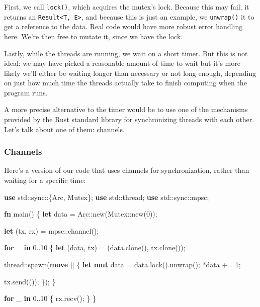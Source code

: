 \documentclass[a4paper,]{book}
\newenvironment{Shaded}{\begin{snugshade}}{\end{snugshade}}
\newcommand{\KeywordTok}[1]{\textcolor[rgb]{0.13,0.29,0.53}{\textbf{{#1}}}}
\newcommand{\DecValTok}[1]{\textcolor[rgb]{0.00,0.00,0.81}{{#1}}}
\newcommand{\NormalTok}[1]{{#1}}
\begin{document}
First, we call \texttt{lock()}, which acquires the mutex's lock. Because
this may fail, it returns an
\texttt{Result\textless{}T,\ E\textgreater{}}, and because this is just
an example, we \texttt{unwrap()} it to get a reference to the data. Real
code would have more robust error handling here. We're then free to
mutate it, since we have the lock.

Lastly, while the threads are running, we wait on a short timer. But
this is not ideal: we may have picked a reasonable amount of time to
wait but it's more likely we'll either be waiting longer than necessary
or not long enough, depending on just how much time the threads actually
take to finish computing when the program runs.

A more precise alternative to the timer would be to use one of the
mechanisms provided by the Rust standard library for synchronizing
threads with each other. Let's talk about one of them: channels.

\subsubsection{Channels}\label{channels}

Here's a version of our code that uses channels for synchronization,
rather than waiting for a specific time:

\begin{Shaded}
\begin{Highlighting}[]
\KeywordTok{use} \NormalTok{std::sync::\{Arc, Mutex\};}
\KeywordTok{use} \NormalTok{std::thread;}
\KeywordTok{use} \NormalTok{std::sync::mpsc;}

\KeywordTok{fn} \NormalTok{main() \{}
    \KeywordTok{let} \NormalTok{data = Arc::new(Mutex::new(}\DecValTok{0}\NormalTok{));}

    \KeywordTok{let} \NormalTok{(tx, rx) = mpsc::channel();}

    \KeywordTok{for} \NormalTok{_ }\KeywordTok{in} \DecValTok{0.}\NormalTok{.}\DecValTok{10} \NormalTok{\{}
        \KeywordTok{let} \NormalTok{(data, tx) = (data.clone(), tx.clone());}

        \NormalTok{thread::spawn(}\KeywordTok{move} \NormalTok{|| \{}
            \KeywordTok{let} \KeywordTok{mut} \NormalTok{data = data.lock().unwrap();}
            \NormalTok{*data += }\DecValTok{1}\NormalTok{;}

            \NormalTok{tx.send(());}
        \NormalTok{\});}
    \NormalTok{\}}

    \KeywordTok{for} \NormalTok{_ }\KeywordTok{in} \DecValTok{0.}\NormalTok{.}\DecValTok{10} \NormalTok{\{}
        \NormalTok{rx.recv();}
    \NormalTok{\}}
\NormalTok{\}}
\end{Highlighting}
\end{Shaded}
\end{document}
